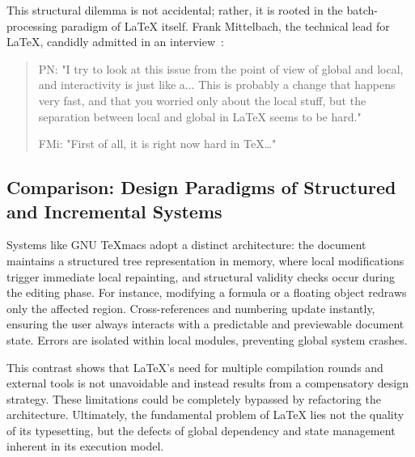 This structural dilemma is not accidental; rather, it is rooted in the batch-processing paradigm of \LaTeX{} itself. Frank Mittelbach, the technical lead for \LaTeX{}, candidly admitted in an interview~\cite{interview2021}:

\begin{quotation}
  PN: "I try to look at this issue from the point of view of global and local, and interactivity is just like a... This is probably a change that happens very fast, and that you worried only about the local stuff, but the separation between local and global in \LaTeX{} seems to be hard."

  FMi: "First of all, it is right now hard in \TeX{}\ldots"
\end{quotation}

\subsection{Comparison: Design Paradigms of Structured and Incremental Systems}

Systems like GNU \TeX{}macs adopt a distinct architecture: the document maintains a structured tree representation in memory, where local modifications trigger immediate local repainting, and structural validity checks occur during the editing phase. For instance, modifying a formula or a floating object redraws only the affected region. Cross-references and numbering update instantly, ensuring the user always interacts with a predictable and previewable document state. Errors are isolated within local modules, preventing global system crashes.

This contrast shows that \LaTeX{}'s need for multiple compilation rounds and external tools is not unavoidable and instead results from a compensatory design strategy. These limitations could be completely bypassed by refactoring the architecture. Ultimately, the fundamental problem of \LaTeX{} lies not the quality of its typesetting, but the defects of global dependency and state management inherent in its execution model.
